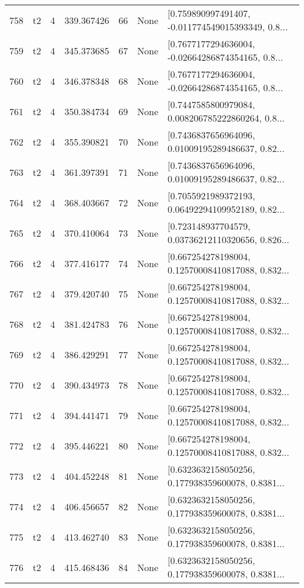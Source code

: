 \begin{tabular}{lllrlll}
758 &  t2 &   4 &   339.367426 &   66 &  None &  [0.759890997491407, -0.011774549015393349, 0.8... \\
759 &  t2 &   4 &   345.373685 &   67 &  None &  [0.7677177294636004, -0.02664286874354165, 0.8... \\
760 &  t2 &   4 &   346.378348 &   68 &  None &  [0.7677177294636004, -0.02664286874354165, 0.8... \\
761 &  t2 &   4 &   350.384734 &   69 &  None &  [0.7447585800979084, 0.008206785222860264, 0.8... \\
762 &  t2 &   4 &   355.390821 &   70 &  None &  [0.7436837656964096, 0.01009195289486637, 0.82... \\
763 &  t2 &   4 &   361.397391 &   71 &  None &  [0.7436837656964096, 0.01009195289486637, 0.82... \\
764 &  t2 &   4 &   368.403667 &   72 &  None &  [0.7055921989372193, 0.06492294109952189, 0.82... \\
765 &  t2 &   4 &   370.410064 &   73 &  None &  [0.723148937704579, 0.03736212110320656, 0.826... \\
766 &  t2 &   4 &   377.416177 &   74 &  None &  [0.667254278198004, 0.12570008410817088, 0.832... \\
767 &  t2 &   4 &   379.420740 &   75 &  None &  [0.667254278198004, 0.12570008410817088, 0.832... \\
768 &  t2 &   4 &   381.424783 &   76 &  None &  [0.667254278198004, 0.12570008410817088, 0.832... \\
769 &  t2 &   4 &   386.429291 &   77 &  None &  [0.667254278198004, 0.12570008410817088, 0.832... \\
770 &  t2 &   4 &   390.434973 &   78 &  None &  [0.667254278198004, 0.12570008410817088, 0.832... \\
771 &  t2 &   4 &   394.441471 &   79 &  None &  [0.667254278198004, 0.12570008410817088, 0.832... \\
772 &  t2 &   4 &   395.446221 &   80 &  None &  [0.667254278198004, 0.12570008410817088, 0.832... \\
773 &  t2 &   4 &   404.452248 &   81 &  None &  [0.6323632158050256, 0.177938359600078, 0.8381... \\
774 &  t2 &   4 &   406.456657 &   82 &  None &  [0.6323632158050256, 0.177938359600078, 0.8381... \\
775 &  t2 &   4 &   413.462740 &   83 &  None &  [0.6323632158050256, 0.177938359600078, 0.8381... \\
776 &  t2 &   4 &   415.468436 &   84 &  None &  [0.6323632158050256, 0.177938359600078, 0.8381... \\

\end{tabular}
